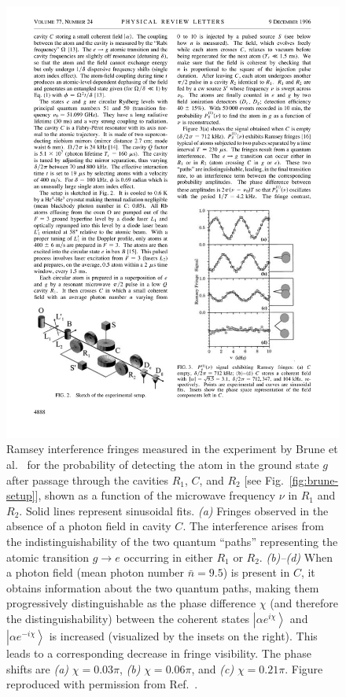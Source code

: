 \documentclass[3p,sort&compress]{elsarticle}
\newcommand{\ket}[1]{\left\vert{#1}\right\rangle}
\newcommand{\E}{\ensuremath{e}}
\newcommand{\I}{\ensuremath{i}}
\begin{document}
\begin{figure}
\centering
\includegraphics[scale=.75]{ramsey.pdf}
\caption{Ramsey interference fringes measured in the experiment by Brune et al.\
  \cite{Brune:1996:om} for the probability of detecting the atom in the ground state $g$ after passage through the cavities $R_1$, $C$, and $R_2$ [see Fig.~\ref{fig:brune-setup}], shown as a function of the microwave frequency $\nu$ in $R_1$ and $R_2$. Solid lines represent sinusoidal fits. \emph{(a)} Fringes observed in the absence of a photon field in cavity $C$. The interference arises from the indistinguishability of the two quantum ``paths'' representing the atomic transition $g\rightarrow e$ occurring in either $R_1$ or $R_2$. \emph{(b)--(d)} When a photon field (mean photon number $\bar{n}=9.5$) is present in $C$, it obtains information about the two quantum paths, making them progressively distinguishable as the phase difference $\chi$ (and therefore the distinguishability) between the coherent states $\ket{\alpha \E^{\I \chi}}$ and $\ket{\alpha \E^{-\I \chi}}$ is increased (visualized by the insets on the right). This leads to a corresponding decrease in fringe visibility. The phase shifts are \emph{(a)} $\chi=0.03\pi$, \emph{(b)} $\chi=0.06\pi$, and \emph{(c)} $\chi=0.21\pi$.  Figure reproduced with permission from Ref.~\cite{Brune:1996:om}.}
\label{fig:ramsey}
\end{figure}
\end{document}
